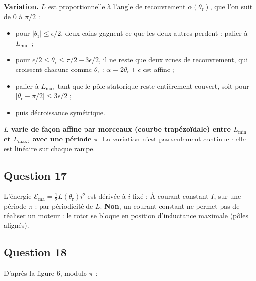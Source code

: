 \documentclass[11pt,a4paper]{article}
\providecommand{\tightlist}{\setlength{\itemsep}{0pt}\setlength{\parskip}{0pt}}
\newcommand{\equationajustee}[1]{%
  \sbox{\boiteequation}{$\displaystyle #1$}%
  \ifdim\wd\boiteequation>\linewidth
    \[\resizebox{\linewidth}{!}{\usebox{\boiteequation}}\]%
  \else
    \[#1\]%
  \fi}
\begin{document}
\textbf{Variation.} \(L\) est proportionnelle à l'angle de recouvrement \(\alpha(\theta_{\mathrm r})\), que l'on suit de \(0\) à \(\pi/2\) :

\begin{itemize}
\tightlist
\item
  pour \(|\theta_{\mathrm r}|\le\epsilon/2\), deux coins gagnent ce que les deux autres perdent : palier à \(L_{\min}\) ;
\item
  pour \(\epsilon/2\le\theta_{\mathrm r}\le\pi/2-3\epsilon/2\), il ne reste que deux zones de recouvrement, qui croissent chacune comme \(\theta_{\mathrm r}\) : \(\alpha=2\theta_{\mathrm r}+\epsilon\) est affine ;
\item
  palier à \(L_{\max}\) tant que le pôle statorique reste entièrement couvert, soit pour \(|\theta_{\mathrm r}-\pi/2|\le3\epsilon/2\) ;
\item
  puis décroissance symétrique.
\end{itemize}

\textbf{\(L\) varie de façon affine par morceaux (courbe trapézoïdale) entre \(L_{\min}\) et \(L_{\max}\), avec une période \(\pi\).} La variation n'est pas seulement continue : elle est linéaire sur chaque rampe.

\hypertarget{question-17}{%
\subsection{Question 17}\label{question-17}}

L'énergie \(\mathcal E_{\text{ma}}=\tfrac12L(\theta_{\mathrm r})i^2\) est dérivée à \(i\) fixé :
\equationajustee{\boxed{\Gamma=\frac{1}{2}i^2\frac{\mathrm dL}{\mathrm d\theta_{\mathrm r}}}}
À courant constant \(I\), sur une période \(\pi\) :
\equationajustee{\begin{aligned}
\langle\Gamma\rangle&=\frac{I^2}{2\pi}\big[L(\pi)-L(0)\big]\\
&=0
\end{aligned}}
par périodicité de \(L\). \textbf{Non}, un courant constant ne permet pas de réaliser un moteur : le rotor se bloque en position d'inductance maximale (pôles alignés).

\hypertarget{question-18}{%
\subsection{Question 18}\label{question-18}}

D'après la figure 6, modulo \(\pi\) :
\end{document}
